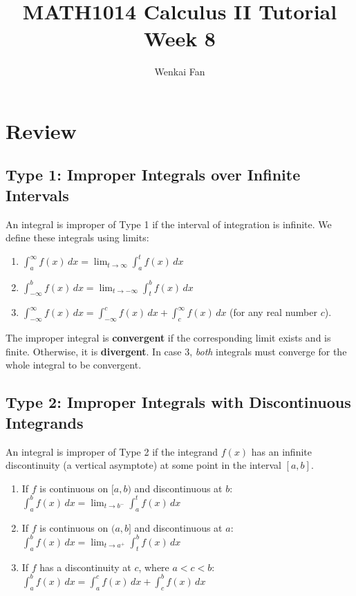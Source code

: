 \documentclass[11pt]{article}
\title{\vspace{-1.0em}MATH1014 Calculus II Tutorial\\Week 8}
\author{Wenkai Fan}
\date{}
\theoremstyle{definition}
\begin{document}
\maketitle
\thispagestyle{fancy}

\section{Review}

\subsection{Type 1: Improper Integrals over Infinite Intervals}
An integral is improper of Type 1 if the interval of integration is infinite. We define these integrals using limits:
\begin{enumerate}
    \item $\displaystyle \int_a^{\infty} f(x)\,dx = \lim_{t \to \infty} \int_a^t f(x)\,dx$
    \item $\displaystyle \int_{-\infty}^b f(x)\,dx = \lim_{t \to -\infty} \int_t^b f(x)\,dx$
    \item $\displaystyle \int_{-\infty}^{\infty} f(x)\,dx = \int_{-\infty}^c f(x)\,dx + \int_c^{\infty} f(x)\,dx$ (for any real number $c$).
\end{enumerate}
The improper integral is \textbf{convergent} if the corresponding limit exists and is finite. Otherwise, it is \textbf{divergent}. In case 3, \textit{both} integrals must converge for the whole integral to be convergent.

\subsection{Type 2: Improper Integrals with Discontinuous Integrands}
An integral is improper of Type 2 if the integrand $f(x)$ has an infinite discontinuity (a vertical asymptote) at some point in the interval $[a, b]$.
\begin{enumerate}
    \item If $f$ is continuous on $[a, b)$ and discontinuous at $b$: $\displaystyle \int_a^b f(x)\,dx = \lim_{t \to b^-} \int_a^t f(x)\,dx$
    \item If $f$ is continuous on $(a, b]$ and discontinuous at $a$: $\displaystyle \int_a^b f(x)\,dx = \lim_{t \to a^+} \int_t^b f(x)\,dx$
    \item If $f$ has a discontinuity at $c$, where $a < c < b$: $\displaystyle \int_a^b f(x)\,dx = \int_a^c f(x)\,dx + \int_c^b f(x)\,dx$
\end{enumerate}
\end{document}
